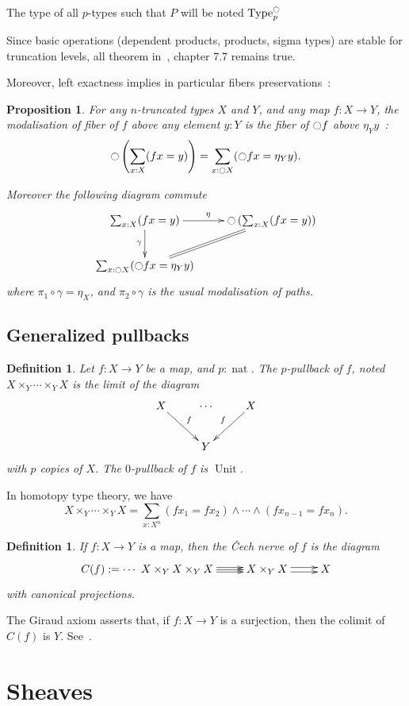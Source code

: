 \documentclass[conference]{IEEEtran}
\makeatletter
\newtheorem{prop}[thm]{Proposition}
\newtheorem{defi}[thm]{Definition}
\def\dar[#1]{\ar@<2pt>[#1]\ar@<-2pt>[#1]}
\def\tar[#1]{\ar@<2pt>[#1]\ar@<0pt>[#1]\ar@<-2pt>[#1]}
\DeclareMathOperator{\Type}{Type}
\DeclareMathOperator{\nat}{nat}
\DeclareMathOperator{\Unit}{Unit}
\newcommand{\modal}{\ensuremath{\ocircle}}
\makeatother
\begin{document}
The type of all $p$-types such that $P$ will be noted $\Type^\modal_p$

Since basic operations (dependent products, products, sigma types) are
stable for truncation levels, all theorem in~\cite{hottbook}, chapter
7.7 remains true.

Moreover, left exactness implies in particular fibers preservations~:
\begin{prop}
For any $n$-truncated types $X$ and $Y$,
and any map $f:X \to Y$, the modalisation of fiber of $f$ above any element $y:Y$
is the fiber of $\modal f$ above $\eta_Y y$~:
$$\modal \left(\sum_{x:X}  (f x = y)\right) = \sum_{x:\modal X} (\modal f x = \eta_Y y).$$

Moreover the following diagram commute
$$\xymatrix{
  \sum_{x:X} (f x = y) \ar[r]^\eta \ar[d]_\gamma & \modal \left(\sum_{x:X}  (f x = y)\right) \ar@{=}[dl]\\
  \sum_{x:\modal X} (\modal f x = \eta_Y y) &
}$$
where $\pi_1 \circ \gamma = \eta_X$, and $\pi_2 \circ \gamma$ is the
usual modalisation of paths.
\end{prop}
\subsection{Generalized pullbacks}
\label{sec:gener-pb}

\begin{defi}
  Let $f:X \to Y$ be a map, and $p:\nat$. The $p$-pullback of $f$,
  noted $X\times_Y \cdots\times_Y X$ is
  the limit of the diagram
  $$\xymatrix{
    X \ar[rd]^f & \cdots & X \ar[ld]_f \\
      &    Y   &
  }$$
  with $p$ copies of $X$. The $0$-pullback of $f$ is $\Unit$.
\end{defi}

In homotopy type theory, we have 
$$X\times_Y \cdots\times_Y X = \sum_{x:X^n} (f x_1 = f x_2) \land
\cdots \land (f x_{n-1} = f x_n).$$
\begin{defi}
  If $f:X \to Y$ is a map, then the {\em \v{C}ech nerve} of $f$ is the
  diagram
  $$\xymatrix{
    C(f) := \cdots~ X \times_Y X \times_Y X \tar[r] & X \times_Y X \dar[r] & X
  }$$
with canonical projections.
\end{defi}

The Giraud axiom asserts that, if $f:X\to Y$ is a surjection, then the
colimit of $C(f)$ is $Y$. See~\cite{lurie}.

\section{Sheaves}
\label{sec:sheaves}
\end{document}
